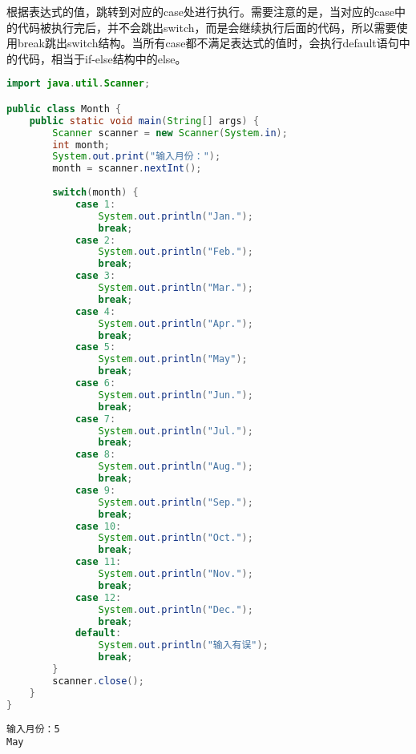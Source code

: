 根据表达式的值，跳转到对应的case处进行执行。需要注意的是，当对应的case中的代码被执行完后，并不会跳出switch，而是会继续执行后面的代码，所以需要使用break跳出switch结构。当所有case都不满足表达式的值时，会执行default语句中的代码，相当于if-else结构中的else。\\


\begin{lstlisting}[language=Java]
import java.util.Scanner;

public class Month {
	public static void main(String[] args) {
		Scanner scanner = new Scanner(System.in);
		int month;
		System.out.print("输入月份：");
		month = scanner.nextInt();
		
		switch(month) {
			case 1:
				System.out.println("Jan.");
				break;
			case 2:
				System.out.println("Feb.");
				break;
			case 3:
				System.out.println("Mar.");
				break;
			case 4:
				System.out.println("Apr.");
				break;
			case 5:
				System.out.println("May");
				break;
			case 6:
				System.out.println("Jun.");
				break;
			case 7:
				System.out.println("Jul.");
				break;
			case 8:
				System.out.println("Aug.");
				break;
			case 9:
				System.out.println("Sep.");
				break;
			case 10:
				System.out.println("Oct.");
				break;
			case 11:
				System.out.println("Nov.");
				break;
			case 12:
				System.out.println("Dec.");
				break;
			default:
				System.out.println("输入有误");
				break;
		}
		scanner.close();
	}
}
\end{lstlisting}

\begin{tcolorbox}
	\begin{verbatim}
输入月份：5
May
	\end{verbatim}
\end{tcolorbox}

\newpage